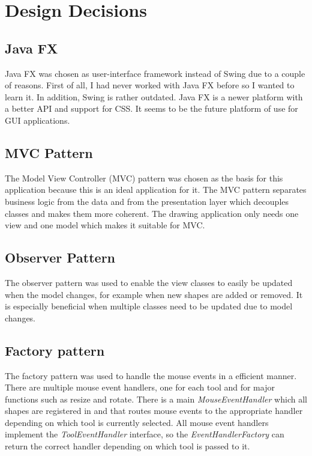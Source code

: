 \documentclass[11pt, a4paper]{article}
\begin{document}
\section{Design Decisions}

\subsection{Java FX}

Java FX was chosen as user-interface framework instead of Swing due to a couple of reasons. First of all, I had never worked with Java FX before so I wanted to learn it. In addition, Swing is rather outdated. Java FX is a newer platform with a better API and support for CSS. It seems to be the future platform of use for GUI applications. 

\subsection{MVC Pattern}

The Model View Controller (MVC) pattern was chosen as the basis for this application because this is an ideal application for it. The MVC pattern separates business logic from the data and from the presentation layer which decouples classes and makes them more coherent. The drawing application only needs one view and one model which makes it suitable for MVC.

\subsection{Observer Pattern}

The observer pattern was used to enable the view classes to easily be updated when the model changes, for example when new shapes are added or removed. It is especially beneficial when multiple classes need to be updated due to model changes.

\subsection{Factory pattern}

The factory pattern was used to handle the mouse events in a efficient manner. There are multiple mouse event handlers, one for each tool and for major functions such as resize and rotate. There is a main \emph{MouseEventHandler} which all shapes are registered in and that routes mouse events to the appropriate handler depending on which tool is currently selected. All mouse event handlers implement the \emph{ToolEventHandler} interface, so the \emph{EventHandlerFactory} can return the correct handler depending on which tool is passed to it.
\end{document}
